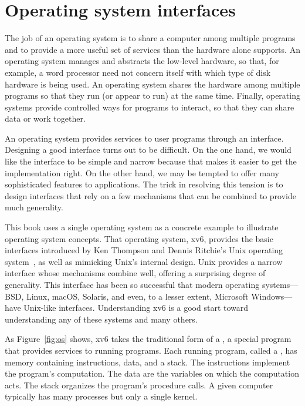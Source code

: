 \chapter{Operating system interfaces}
\label{CH:UNIX}

The job of an operating system is to share a computer among
multiple programs and to provide a more useful set of services
than the hardware alone supports.
An operating system manages and abstracts
the low-level hardware, so that, for example,
a word processor need not concern itself with which type
of disk hardware is being used.
An operating system shares the hardware among multiple programs so
that they run (or appear to run) at the same time.
Finally, operating systems provide controlled ways for programs
to interact, so that they can share data or work together.

An operating system provides services to user programs through an interface.
Designing a good interface turns out to be
difficult.  On the one hand, we would like the interface to be
simple and narrow because that makes it easier to get the
implementation right.  On the other hand,
we may be tempted to offer many sophisticated features to applications.
The trick in
resolving this tension is to design interfaces that rely on a few
mechanisms that can be combined to provide much generality.

This book uses a single operating system as a concrete example to
illustrate operating system concepts.  That operating system,
xv6, provides the basic interfaces introduced by Ken Thompson and
Dennis Ritchie's Unix operating system~\cite{unix}, as well as mimicking Unix's
internal design.  Unix provides a
narrow interface whose mechanisms combine well, offering a surprising
degree of generality.  This interface has been so successful that
modern operating systems—BSD, Linux, macOS, Solaris, and even, to a
lesser extent, Microsoft Windows—have Unix-like interfaces.
Understanding xv6 is a good start toward understanding any of these
systems and many others.

As 
Figure~\ref{fig:os} shows,
xv6 takes the traditional form of a
,
a special program that provides
services to running programs.
Each running program, called a
,
has memory containing instructions, data, and a stack. The
instructions implement the
program's computation.  The data are the variables on which
the computation acts. The stack organizes the program's procedure calls.
A given computer typically has many processes but only a single
kernel.

